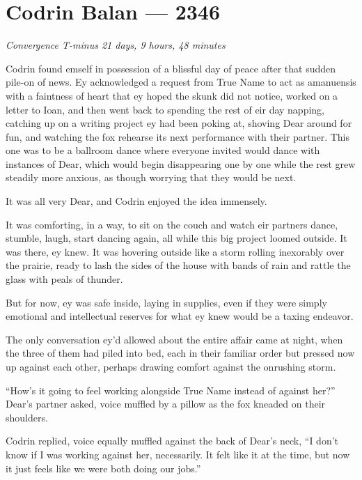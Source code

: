 \hypertarget{codrin-balan-2346}{%
\chapter{Codrin Balan — 2346}\label{codrin-balan-2346}}

\begin{center}
\emph{Convergence T-minus 21 days, 9 hours, 48 minutes}
\end{center}

\noindent Codrin found emself in possession of a blissful day of peace after that sudden pile-on of news. Ey acknowledged a request from True Name to act as amanuensis with a faintness of heart that ey hoped the skunk did not notice, worked on a letter to Ioan, and then went back to spending the rest of eir day napping, catching up on a writing project ey had been poking at, shoving Dear around for fun, and watching the fox rehearse its next performance with their partner. This one was to be a ballroom dance where everyone invited would dance with instances of Dear, which would begin disappearing one by one while the rest grew steadily more anxious, as though worrying that they would be next.

It was all very Dear, and Codrin enjoyed the idea immensely.

It was comforting, in a way, to sit on the couch and watch eir partners dance, stumble, laugh, start dancing again, all while this big project loomed outside. It was there, ey knew. It was hovering outside like a storm rolling inexorably over the prairie, ready to lash the sides of the house with bands of rain and rattle the glass with peals of thunder.

But for now, ey was safe inside, laying in supplies, even if they were simply emotional and intellectual reserves for what ey knew would be a taxing endeavor.

The only conversation ey'd allowed about the entire affair came at night, when the three of them had piled into bed, each in their familiar order but pressed now up against each other, perhaps drawing comfort against the onrushing storm.

``How's it going to feel working alongside True Name instead of against her?'' Dear's partner asked, voice muffled by a pillow as the fox kneaded on their shoulders.

Codrin replied, voice equally muffled against the back of Dear's neck, ``I don't know if I was working against her, necessarily. It felt like it at the time, but now it just feels like we were both doing our jobs.''

